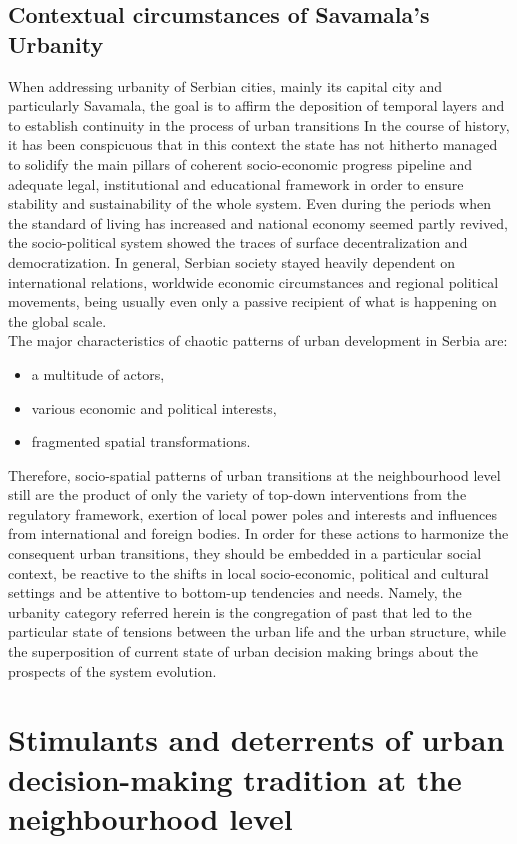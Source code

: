 \documentclass[11pt]{report}
\begin{document}
\subsection{Contextual circumstances of Savamala's Urbanity}
When addressing urbanity of Serbian cities, mainly its capital city and particularly Savamala, the goal is to affirm the deposition of temporal layers and to establish continuity in the process of urban transitions \cite{(Grozdanic 2008)}
In the course of history, it has been conspicuous that in this context the state has not hitherto managed to solidify the main pillars of coherent socio-economic progress pipeline and adequate legal, institutional and educational framework in order to ensure stability and sustainability of the whole system. Even during the periods when the standard of living has increased and national economy seemed partly revived, the socio-political system showed the traces of surface decentralization and democratization. In general, Serbian society stayed heavily dependent on international relations, worldwide economic circumstances and regional political movements, being usually even only a passive recipient of what is happening on the global scale.
\\
The major characteristics of chaotic patterns of urban development in Serbia are:
\begin{itemize}
\item a multitude of actors,
\item various economic and political interests,
\item fragmented spatial transformations.
\end{itemize}

Therefore, socio-spatial patterns of urban transitions at the neighbourhood level still are the product of only the variety of top-down interventions from the regulatory framework, exertion of local power poles and interests and influences from international and foreign bodies. In order for these actions to harmonize the consequent urban transitions, they should be embedded in a particular social context, be reactive to the shifts in local socio-economic, political and cultural settings and be attentive to bottom-up tendencies and needs. Namely, the urbanity category referred herein is the congregation of past that led to the particular state of tensions between the urban life and the urban structure, while the superposition of current state of urban decision making brings about the prospects of the system evolution.

\section{Stimulants and deterrents of urban decision-making tradition at the neighbourhood level}
\end{document}

